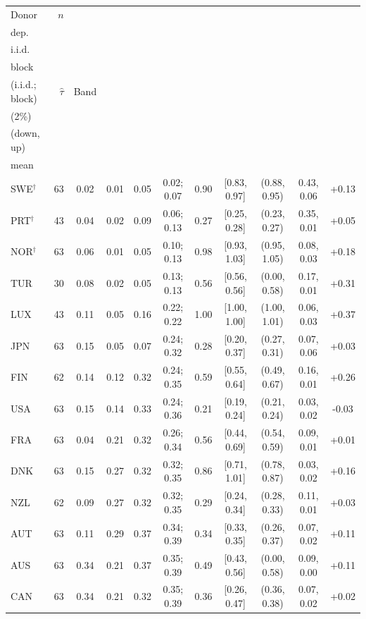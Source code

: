 \begin{tabular}{lrccccrcccc}\toprule
Donor & $n$ & \hd{State\\dep.} & \hd{PA\\i.i.d.} & \hd{PA\\block} & \hd{Both\\(i.i.d.; block)} & $\hat\tau$ & Band & \hd{$\tau$ set\\(2\%)} & \hd{Steps\\(down, up)} & \hd{$\hat\tau-{}$\\mean}\\\midrule
SWE$^{\dagger}$ & 63 & 0.02 & 0.01 & 0.05 & 0.02; 0.07 & 0.90 & [0.83, 0.97] & (0.88, 0.95) & 0.43, 0.06 & +0.13\\
PRT$^{\dagger}$ & 43 & 0.04 & 0.02 & 0.09 & 0.06; 0.13 & 0.27 & [0.25, 0.28] & (0.23, 0.27) & 0.35, 0.01 & +0.05\\
NOR$^{\dagger}$ & 63 & 0.06 & 0.01 & 0.05 & 0.10; 0.13 & 0.98 & [0.93, 1.03] & (0.95, 1.05) & 0.08, 0.03 & +0.18\\
TUR & 30 & 0.08 & 0.02 & 0.05 & 0.13; 0.13 & 0.56 & [0.56, 0.56] & (0.00, 0.58) & 0.17, 0.01 & +0.31\\
LUX & 43 & 0.11 & 0.05 & 0.16 & 0.22; 0.22 & 1.00 & [1.00, 1.00] & (1.00, 1.01) & 0.06, 0.03 & +0.37\\
JPN & 63 & 0.15 & 0.05 & 0.07 & 0.24; 0.32 & 0.28 & [0.20, 0.37] & (0.27, 0.31) & 0.07, 0.06 & +0.03\\
FIN & 62 & 0.14 & 0.12 & 0.32 & 0.24; 0.35 & 0.59 & [0.55, 0.64] & (0.49, 0.67) & 0.16, 0.01 & +0.26\\
USA & 63 & 0.15 & 0.14 & 0.33 & 0.24; 0.36 & 0.21 & [0.19, 0.24] & (0.21, 0.24) & 0.03, 0.02 & -0.03\\
FRA & 63 & 0.04 & 0.21 & 0.32 & 0.26; 0.34 & 0.56 & [0.44, 0.69] & (0.54, 0.59) & 0.09, 0.01 & +0.01\\
DNK & 63 & 0.15 & 0.27 & 0.32 & 0.32; 0.35 & 0.86 & [0.71, 1.01] & (0.78, 0.87) & 0.03, 0.02 & +0.16\\
NZL & 62 & 0.09 & 0.27 & 0.32 & 0.32; 0.35 & 0.29 & [0.24, 0.34] & (0.28, 0.33) & 0.11, 0.01 & +0.03\\
AUT & 63 & 0.11 & 0.29 & 0.37 & 0.34; 0.39 & 0.34 & [0.33, 0.35] & (0.26, 0.37) & 0.07, 0.02 & +0.11\\
AUS & 63 & 0.34 & 0.21 & 0.37 & 0.35; 0.39 & 0.49 & [0.43, 0.56] & (0.00, 0.58) & 0.09, 0.00 & +0.11\\
CAN & 63 & 0.34 & 0.21 & 0.32 & 0.35; 0.39 & 0.36 & [0.26, 0.47] & (0.36, 0.38) & 0.07, 0.02 & +0.02\\

\end{tabular}
